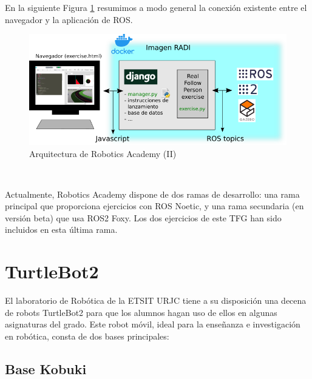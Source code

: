 En la siguiente Figura \ref{fig:infraestructura_robotics_academy} resumimos a modo general la conexión existente entre el navegador y la aplicación de ROS.

\begin{figure} [H]
  \begin{center}
    \includegraphics[width=15cm]{imagenes/cap3/esquema-robotics-academy.png}
  \end{center}
  \caption{Arquitectura de Robotics Academy (II)}
  \label{fig:infraestructura_robotics_academy}
\end{figure}\

Actualmente, Robotics Academy dispone de dos ramas de desarrollo: una rama principal que proporciona ejercicios con ROS Noetic, y una rama secundaria (en versión beta) que usa ROS2 Foxy. Los dos ejercicios de este TFG han sido incluidos en esta última rama. 


\section{TurtleBot2}
\label{sec:turtlebot2}

El laboratorio de Robótica de la ETSIT URJC tiene a su disposición una decena de robots TurtleBot2 para que los alumnos hagan uso de ellos en algunas asignaturas del grado. Este robot móvil, ideal para la enseñanza e investigación en robótica, consta de dos bases principales:\\

\subsection{Base Kobuki}
\label{subsec:turtlebot_base_kobuki}

